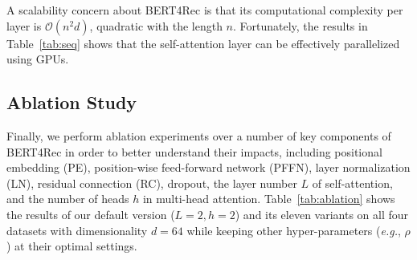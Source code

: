 A scalability concern about BERT4Rec is that its computational complexity per layer is $\mathcal{O}(n^2d)$, quadratic with the length $n$.
Fortunately, the results in Table~\ref{tab:seq} shows that the self-attention layer can be effectively parallelized using GPUs.








\subsection{Ablation Study}


Finally, we perform ablation experiments over a number of key components of BERT4Rec in order to better understand their impacts, including positional embedding (PE), position-wise feed-forward network (PFFN), layer normalization (LN), residual connection (RC), dropout, the layer number $L$ of self-attention, and the number of heads $h$ in multi-head attention. %
Table~\ref{tab:ablation} shows the results of our default version ($L=2, h=2$) and its eleven variants on all four datasets with dimensionality $d=64$ while keeping other hyper-parameters (\textit{e.g.}, $\rho$) at their optimal settings. %




